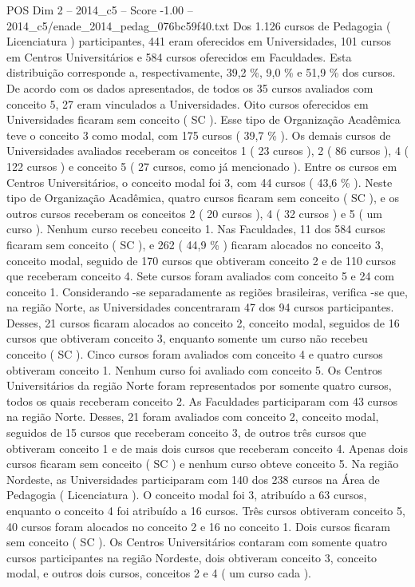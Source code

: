 \begin{textsample}{POS Dim 2 – 2014\_c5 – Score -1.00 – 2014\_c5/enade\_2014\_pedag\_076bc59f40.txt}
Dos 1.126 cursos de Pedagogia ( Licenciatura ) participantes, 441 eram oferecidos em Universidades, 101 cursos em Centros Universitários e 584 cursos oferecidos em Faculdades.
Esta distribuição corresponde a, respectivamente, 39,2 \%, 9,0 \% e 51,9 \% dos cursos.
De acordo com os dados apresentados, de todos os 35 cursos avaliados com conceito 5, 27 eram vinculados a Universidades.
Oito cursos oferecidos em Universidades ficaram sem conceito ( SC ).
Esse tipo de Organização Acadêmica teve o conceito 3 como modal, com 175 cursos ( 39,7 \% ).
Os demais cursos de Universidades avaliados receberam os conceitos 1 ( 23 cursos ), 2 ( 86 cursos ), 4 ( 122 cursos ) e conceito 5 ( 27 cursos, como já mencionado ).
Entre os cursos em Centros Universitários, o conceito modal foi 3, com 44 cursos ( 43,6 \% ).
Neste tipo de Organização Acadêmica, quatro cursos ficaram sem conceito ( SC ), e os outros cursos receberam os conceitos 2 ( 20 cursos ), 4 ( 32 cursos ) e 5 ( um curso ).
Nenhum curso recebeu conceito 1.
Nas Faculdades, 11 dos 584 cursos ficaram sem conceito ( SC ), e 262 ( 44,9 \% ) ficaram alocados no conceito 3, conceito modal, seguido de 170 cursos que obtiveram conceito 2 e de 110 cursos que receberam conceito 4.
Sete cursos foram avaliados com conceito 5 e 24 com conceito 1.
Considerando -se separadamente as regiões brasileiras, verifica -se que, na região Norte, as Universidades concentraram 47 dos 94 cursos participantes.
Desses, 21 cursos ficaram alocados ao conceito 2, conceito modal, seguidos de 16 cursos que obtiveram conceito 3, enquanto somente um curso não recebeu conceito ( SC ).
Cinco cursos foram avaliados com conceito 4 e quatro cursos obtiveram conceito 1.
Nenhum curso foi avaliado com conceito 5.
Os Centros Universitários da região Norte foram representados por somente quatro cursos, todos os quais receberam conceito 2.
As Faculdades participaram com 43 cursos na região Norte.
Desses, 21 foram avaliados com conceito 2, conceito modal, seguidos de 15 cursos que receberam conceito 3, de outros três cursos que obtiveram conceito 1 e de mais dois cursos que receberam conceito 4.
Apenas dois cursos ficaram sem conceito ( SC ) e nenhum curso obteve conceito 5.
Na região Nordeste, as Universidades participaram com 140 dos 238 cursos na Área de Pedagogia ( Licenciatura ).
O conceito modal foi 3, atribuído a 63 cursos, enquanto o conceito 4 foi atribuído a 16 cursos.
Três cursos obtiveram conceito 5, 40 cursos foram alocados no conceito 2 e 16 no conceito 1.
Dois cursos ficaram sem conceito ( SC ).
Os Centros Universitários contaram com somente quatro cursos participantes na região Nordeste, dois obtiveram conceito 3, conceito modal, e outros dois cursos, conceitos 2 e 4 ( um curso cada ).

\end{textsample}
